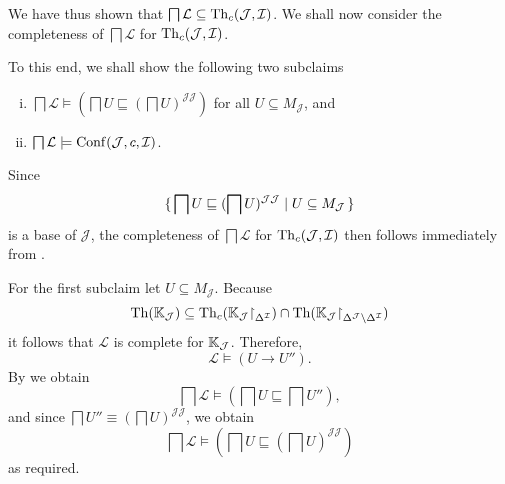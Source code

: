 \begin{Proof}
  We have thus shown that $\bigsqcap \mathcal{L} \subseteq \operatorname{Th}_{c}(\mathcal{J},
  \mathcal{I})$.  We shall now consider the completeness of $\bigsqcap \mathcal{L}$ for
  $\operatorname{Th}_{c}(\mathcal{J}, \mathcal{I})$.

  To this end, we shall show the following two subclaims
  \begin{enumerate}[i. ]
  \item $\bigsqcap \mathcal{L} \models (\bigsqcap U \sqsubseteq (\bigsqcap
    U)^{\mathcal{J}\mathcal{J}})$ for all $U \subseteq M_{\mathcal{J}}$, and
  \item $\bigsqcap \mathcal{L} \models \operatorname{Conf}(\mathcal{J}, c, \mathcal{I})$.
  \end{enumerate}
  Since
  \begin{equation*}
    {\ensuremath{\{\, \bigsqcap U \sqsubseteq (\bigsqcap U)^{\mathcal{J}\mathcal{J}} \mid U \subseteq
      M_{\mathcal{J}} \,\}}}
  \end{equation*}
  is a base of $\mathcal{J}$, the completeness of $\bigsqcap \mathcal{L}$ for
  $\operatorname{Th}_{c}(\mathcal{J}, \mathcal{I})$ then follows immediately from
  .

  For the first subclaim let $U \subseteq M_{\mathcal{J}}$.  Because
  \begin{equation*}
    \operatorname{Th}({\mathbb{K}}_{\mathcal{J}}) \subseteq \operatorname{Th}_{c}({\mathbb{K}}_{\mathcal{J}}
    \mathord{\upharpoonright}_{\Delta^{\mathcal{I}}}) \cap \operatorname{Th}({\mathbb{K}}_{\mathcal{J}}
    \mathord{\upharpoonright}_{\Delta^{\mathcal{J}} \setminus \Delta^{\mathcal{I}}})
  \end{equation*}
  it follows that $\mathcal{L}$ is complete for ${\mathbb{K}}_{\mathcal{J}}$.  Therefore,
  \begin{equation*}
    \mathcal{L} \models (U \to U'').
  \end{equation*}
  By  we obtain
  \begin{equation*}
    \bigsqcap \mathcal{L} \models (\bigsqcap U \sqsubseteq \bigsqcap U''),
  \end{equation*}
  and since $\bigsqcap U'' \equiv (\bigsqcap U)^{\mathcal{J}\mathcal{J}}$,  we obtain
  \begin{equation*}
    \bigsqcap \mathcal{L} \models (\bigsqcap U \sqsubseteq (\bigsqcap U)^{\mathcal{J}\mathcal{J}})
  \end{equation*}
  as required.


\end{Proof}
